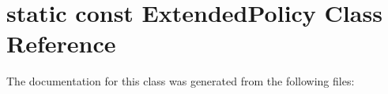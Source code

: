\hypertarget{classstatic_01const_01ExtendedPolicy}{}\section{static const Extended\+Policy Class Reference}
\label{classstatic_01const_01ExtendedPolicy}


The documentation for this class was generated from the following files\+: